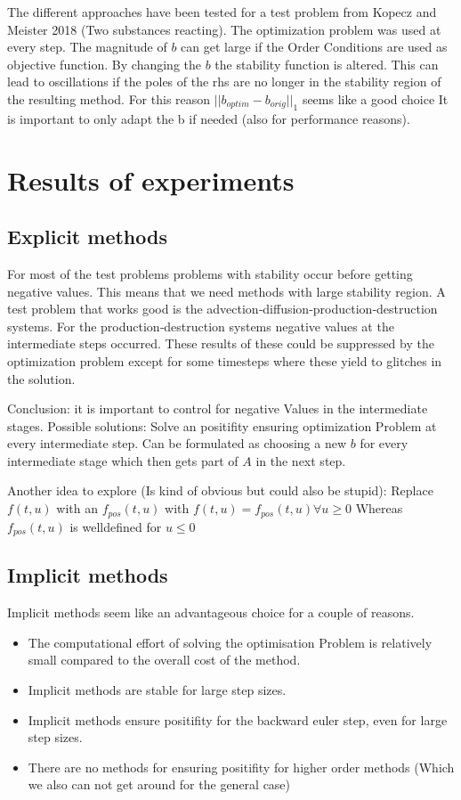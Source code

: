 \documentclass{article}
\begin{document}
The different approaches have been tested for a test problem from Kopecz and Meister 2018 (Two substances reacting). The optimization problem was used at every step.
The magnitude of $b$ can get large if the Order Conditions are used as objective function.
By changing the $b$ the stability function is altered. This can lead to oscillations if the poles of the rhs are no longer in the stability region of the resulting method.
For this reason $||b_{optim}-b_{orig}||_1$ seems like a good choice
It is important to only adapt the b if needed (also for performance reasons).


\section{Results of experiments}
\subsection{Explicit methods}
For most of the test problems problems with stability occur before getting negative values. This means that we need methods with large stability region.
A test problem that works good is the advection‐diffusion‐production‐destruction systems. 
For the production‐destruction systems negative values at the intermediate steps occurred. These results of these could be suppressed by the optimization problem  except for some timesteps where these yield to glitches in the solution.

Conclusion: it is important to control for negative Values in the intermediate stages.
Possible solutions: Solve an positifity ensuring optimization Problem at every intermediate step.
Can be formulated as choosing a new $b$ for every intermediate stage which then gets part of $A$ in the next step.

Another idea to explore (Is kind of obvious but could also be stupid): Replace $f(t,u)$ with an $f_{pos}(t,u)$ with 
$f(t,u)=f_{pos}(t,u) \forall u \geq 0 $
Whereas $f_{pos}(t,u)$ is welldefined for $u \leq 0$


\subsection{Implicit methods}
Implicit methods seem like an advantageous choice for a couple of reasons.

\begin{itemize}
\item The computational effort of solving the optimisation Problem is relatively small compared to the overall cost of the method.
\item Implicit methods are stable for large step sizes.
\item Implicit methods ensure positifity for the backward euler step, even for large step sizes.
\item There are no methods for ensuring positifity for higher order methods (Which we also can not get around for the general case)
\end{itemize}
\end{document}
